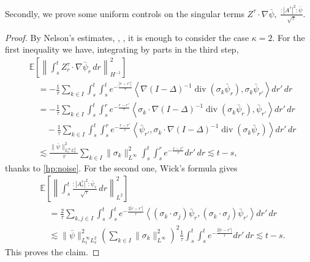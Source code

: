 \documentclass[a4paper,10pt]{amsart}
\newcommand{\norm}[1]{\left\|#1\right\|}
\newcommand{\wick}[1]{:\mathrel{#1}:}
\newcommand{\expt}[1]{\mathbb{E}\left[#1\right]}
\newtheorem{proposition}[theorem]{Proposition}
\theoremstyle{remark}
\numberwithin{equation}{section}
\begin{document}
Secondly, we prove some uniform controls on the singular terms $ Z^{\tau}\cdot\nabla\bar{\psi},\ \frac{\wick{|A^\tau|^2}\bar{\psi}}{\sqrt{\tau}} $.
\begin{proof}
    By Nelson's estimates, \cite{nelson1973free}, \cite[Theorem 3.50]{janson1997gaussian}, it is enough to consider the case $\kappa=2.$ For the first inequality we have, integrating by parts in the third step,  
    \begin{align*}
         &\expt{\norm{\int_s^t Z^{\tau}_r\cdot\nabla\bar{\psi}_r\,dr}_{H^{-1}}^2}\\
         &\quad=-\frac{1}{\tau}\sum_{k\in I}\int_s^t\int_s^t
         e^{-\frac{|r-r'|}{\tau}}
         \left\langle\nabla(I-\Delta)^{-1}
         \operatorname{div}(\sigma_k\bar\psi_r),
         \sigma_k\bar\psi_{r'}\right\rangle dr'\,dr\\
         &\quad=-\frac{1}{\tau}\sum_{k\in I}\int_s^t\int_s^r
         e^{-\frac{r-r'}{\tau}}
         \left\langle\sigma_k\cdot\nabla(I-\Delta)^{-1}
         \operatorname{div}(\sigma_k\bar\psi_r),
         \bar\psi_{r'}\right\rangle dr'\,dr\\
         &\qquad-\frac{1}{\tau}\sum_{k\in I}\int_s^t\int_s^r
         e^{-\frac{r-r'}{\tau}}
         \left\langle\bar\psi_{r'},
         \sigma_k\cdot\nabla(I-\Delta)^{-1}
         \operatorname{div}(\sigma_k\bar\psi_r)\right\rangle dr'\,dr\\
         &\quad\lesssim
         \frac{\|\bar{\psi}\|_{L^{\infty}_tL^2_x}^2}{\tau}
         \sum_{k\in I}\|\sigma_k\|_{L^\infty}^2
         \int_s^t\int_s^r e^{-\frac{r-r'}{\tau}}dr'\,dr
         \lesssim t-s,
    \end{align*}
    thanks to \cref{hp:noise}. For the second one, Wick's formula gives
    \begin{align*}
       &\expt{\norm{\int_s^t
       \frac{\wick{|A^\tau_r|^2}\bar{\psi}_r}{\sqrt{\tau}}\,dr}_{L^2}^2}\\
       &\quad=\frac{2}{\tau}\sum_{k,j\in I}\int_s^t\int_s^t
       e^{-\frac{2|r-r'|}{\tau}}
       \left\langle
       (\sigma_k\cdot\sigma_j)\bar\psi_r,
       (\sigma_k\cdot\sigma_j)\bar\psi_{r'}
       \right\rangle dr'\,dr\\
       &\quad\lesssim
       \|\bar\psi\|_{L^\infty_tL^2_x}^2
       \left(\sum_{k\in I}\|\sigma_k\|_{L^\infty}^2\right)^2
       \frac{1}{\tau}\int_s^t\int_s^t
       e^{-\frac{2|r-r'|}{\tau}}dr'\,dr
       \lesssim t-s.
    \end{align*}
    This proves the claim.
\end{proof}
\end{document}
